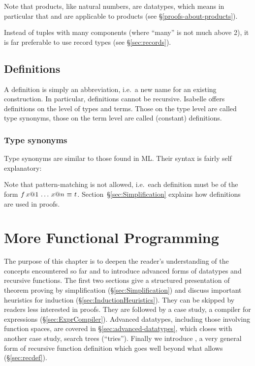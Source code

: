 Note that products, like natural numbers, are datatypes, which means
in particular that  and  are applicable to
products (see \S\ref{proofs-about-products}).

Instead of tuples with many components (where ``many'' is not much above 2),
it is far preferable to use record types (see \S\ref{sec:records}).

\section{Definitions}
\label{sec:Definitions}

A definition is simply an abbreviation, i.e.\ a new name for an existing
construction. In particular, definitions cannot be recursive. Isabelle offers
definitions on the level of types and terms. Those on the type level are
called type synonyms, those on the term level are called (constant)
definitions.


\subsection{Type synonyms}

Type synonyms are similar to those found in ML. Their syntax is fairly self
explanatory:

%

Note that pattern-matching is not allowed, i.e.\ each definition must be of
the form $f\,x@1\,\dots\,x@n~\emph{$\equiv$}~t$.
Section~\S\ref{sec:Simplification} explains how definitions are used
in proofs.




\chapter{More Functional Programming}

The purpose of this chapter is to deepen the reader's understanding of the
concepts encountered so far and to introduce advanced forms of datatypes and
recursive functions. The first two sections give a structured presentation of
theorem proving by simplification (\S\ref{sec:Simplification}) and discuss
important heuristics for induction (\S\ref{sec:InductionHeuristics}). They can
be skipped by readers less interested in proofs. They are followed by a case
study, a compiler for expressions (\S\ref{sec:ExprCompiler}). Advanced
datatypes, including those involving function spaces, are covered in
\S\ref{sec:advanced-datatypes}, which closes with another case study, search
trees (``tries'').  Finally we introduce , a very general
form of recursive function definition which goes well beyond what
 allows (\S\ref{sec:recdef}).


